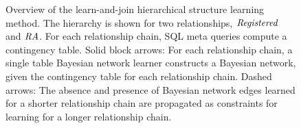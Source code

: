 \begin{figure}[htbp] %
 \centering
{} 
\caption{Overview of the learn-and-join hierarchical structure learning method. The hierarchy is shown for 
two relationships, $\it{Registered}$ and $\it{RA}$. For each relationship chain, SQL meta queries compute a contingency table. Solid block arrows: For each relationship chain, a single table Bayesian network learner constructs a Bayesian network, given the contingency table for each relationship chain. Dashed arrows: The absence and presence of Bayesian network edges learned for a shorter relationship chain are propagated as constraints for learning for a longer relationship chain.}
 \label{fig:lattice}
\end{figure}

